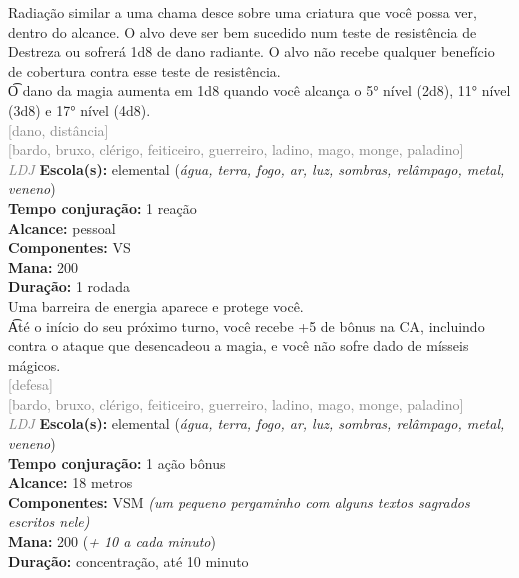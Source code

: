 \documentclass{RPG_Adventure}[2021/10/20]
\begin{document}
{\normalsize Radiação similar a uma chama desce sobre uma criatura que você possa ver, dentro do alcance. O alvo deve ser bem sucedido num teste de resistência de Destreza ou sofrerá 1d8 de dano radiante. O alvo não recebe qualquer benefício de cobertura contra esse teste de resistência.\\\t O dano da magia aumenta em 1d8 quando você alcança o 5° nível (2d8), 11° nível (3d8) e 17° nível (4d8).\\}
{\scriptsize \textcolor{gray}{[dano, distância]\\}}
{\scriptsize \textcolor{gray}{[bardo, bruxo, clérigo, feiticeiro, guerreiro, ladino, mago, monge, paladino]\\}}
{\tiny \textcolor{gray}{\textit{LDJ}}}
{\small \t \textbf{Escola(s):} elemental (\textit{água, terra, fogo, ar, luz, sombras, relâmpago, metal, veneno})\\\t \textbf{Tempo conjuração:} 1 reação\\\t \textbf{Alcance:} pessoal\\\t \textbf{Componentes:} VS\\\t \textbf{Mana:} 200\\\t \textbf{Duração:} 1 rodada\\}
{\normalsize Uma barreira de energia aparece e protege você.\\\t Até o início do seu próximo turno, você recebe +5 de bônus na CA, incluindo contra o ataque que desencadeou a magia, e você não sofre dado de mísseis mágicos.\\}
{\scriptsize \textcolor{gray}{[defesa]\\}}
{\scriptsize \textcolor{gray}{[bardo, bruxo, clérigo, feiticeiro, guerreiro, ladino, mago, monge, paladino]\\}}
{\tiny \textcolor{gray}{\textit{LDJ}}}
{\small \t \textbf{Escola(s):} elemental (\textit{água, terra, fogo, ar, luz, sombras, relâmpago, metal, veneno})\\\t \textbf{Tempo conjuração:} 1 ação bônus\\\t \textbf{Alcance:} 18 metros\\\t \textbf{Componentes:} VSM \textit{(um pequeno pergaminho com alguns textos sagrados escritos nele)}\\\t \textbf{Mana:} 200 (\textit{+ 10 a cada minuto})\\\t \textbf{Duração:} concentração, até 10 minuto\\}
\end{document}
